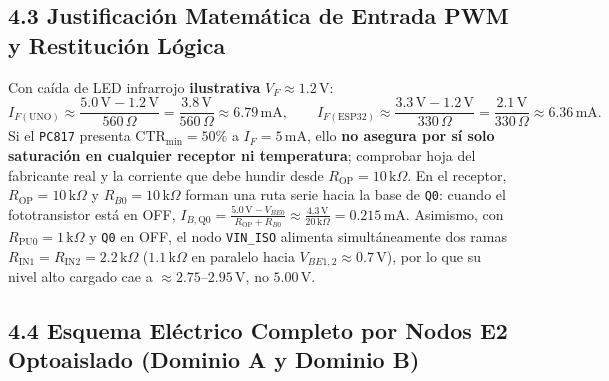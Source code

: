 \documentclass[10pt, a4paper, landscape]{article}
\begin{document}
\subsection*{4.3 Justificación Matemática de Entrada PWM y Restitución Lógica}
Con caída de LED infrarrojo \textbf{ilustrativa} $V_F \approx 1.2\,\text{V}$:
\begin{equation}
    I_{F(\text{UNO})} \approx \frac{5.0\,\text{V} - 1.2\,\text{V}}{560\,\Omega} = \frac{3.8\,\text{V}}{560\,\Omega} \approx 6.79\,\text{mA}, \qquad
    I_{F(\text{ESP32})} \approx \frac{3.3\,\text{V} - 1.2\,\text{V}}{330\,\Omega} = \frac{2.1\,\text{V}}{330\,\Omega} \approx 6.36\,\text{mA}.
\end{equation}
Si el \texttt{PC817} presenta $\text{CTR}_{\min} = 50\%$ a $I_F = 5\,\text{mA}$, ello \textbf{no asegura por sí solo saturación en cualquier receptor ni temperatura}; comprobar hoja del fabricante real y la corriente que debe hundir desde $R_{\text{OP}} = 10\,\text{k}\Omega$. En el receptor, $R_{\text{OP}} = 10\,\text{k}\Omega$ y $R_{B0} = 10\,\text{k}\Omega$ forman una ruta serie hacia la base de \texttt{Q0}: cuando el fototransistor está en OFF, $I_{B,\text{Q0}} = \frac{5.0\,\text{V} - V_{BE0}}{R_{\text{OP}} + R_{B0}} \approx \frac{4.3\,\text{V}}{20\,\text{k}\Omega} = 0.215\,\text{mA}$. Asimismo, con $R_{\text{PU0}} = 1\,\text{k}\Omega$ y \texttt{Q0} en OFF, el nodo \texttt{VIN\_ISO} alimenta simultáneamente dos ramas $R_{\text{IN1}} = R_{\text{IN2}} = 2.2\,\text{k}\Omega$ ($1.1\,\text{k}\Omega$ en paralelo hacia $V_{BE1,2} \approx 0.7\,\text{V}$), por lo que su nivel alto cargado cae a $\approx 2.75\text{--}2.95\,\text{V}$, no $5.00\,\text{V}$.

\newpage
\subsection*{4.4 Esquema Eléctrico Completo por Nodos E2 Optoaislado (Dominio A y Dominio B)}
\end{document}
